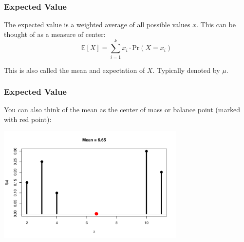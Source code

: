 \documentclass[handout]{beamer}
\newcommand{\blue}[1]{\textcolor{blue2}{#1}}
\newcommand{\prob}{\mbox{Pr}}
\newcommand{\E}{\mathbb{E}}
\begin{document}
\begin{frame}
\frametitle{Expected Value}
%
%
The \blue{expected value} is a \blue{weighted average} of all possible values $x$.  This can be thought of as a measure of \blue{center}:
\[
\E[X] = \sum_{i=1}^k x_i \cdot \prob(X=x_i) 
\]

This is also called the \blue{mean} and \blue{expectation} of $X$.  Typically denoted by $\mu$.
\end{frame}


\begin{frame}
\frametitle{Expected Value}
You can also think of the mean as the \blue{center of mass or balance point} (marked with red point):

\begin{center}
\includegraphics[width=0.7\textwidth]{figure/mean}
\end{center}

\end{frame}
\end{document}

